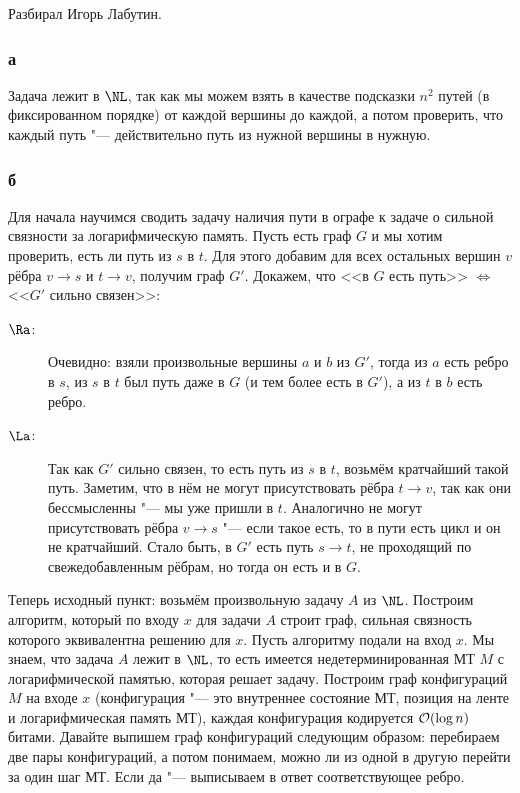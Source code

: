 	Разбирал Игорь Лабутин.

	\subsubsection{а}
		Задача лежит в $\NL$, так как мы можем взять в качестве подсказки
		$n^2$ путей (в фиксированном порядке) от каждой вершины до каждой,
		а потом проверить, что каждый путь "--- действительно путь из нужной вершины
		в нужную.

	\subsubsection{б}
		Для начала научимся сводить задачу наличия пути в ографе к
		задаче о сильной связности за логарифмическую память.
		Пусть есть граф $G$ и мы хотим проверить, есть ли путь из $s$ в $t$.
		Для этого добавим для всех остальных вершин $v$ рёбра $v \to s$ и $t \to v$,
		получим граф $G'$.
		Докажем, что <<в $G$ есть путь>> $\iff$ <<$G'$ сильно связен>>:
		\begin{description}
			\item[$\Ra$:]
				Очевидно: взяли произвольные вершины $a$ и $b$ из $G'$,
				тогда из $a$ есть ребро в $s$, из $s$ в $t$ был путь даже в
				$G$ (и тем более есть в $G'$), а из $t$ в $b$ есть ребро.
			\item[$\La$:]
				Так как $G'$ сильно связен, то есть путь из $s$ в $t$,
				возьмём кратчайший такой путь.
				Заметим, что в нём не могут присутствовать рёбра $t \to v$,
				так как они бессмысленны "--- мы уже пришли в $t$.
				Аналогично не могут присутствовать рёбра $v \to s$ "---
				если такое есть, то в пути есть цикл и он не кратчайший.
				Стало быть, в $G'$ есть путь $s \to t$, не проходящий по свежедобавленным рёбрам,
				но тогда он есть и в $G$.
		\end{description}

		Теперь исходный пункт: возьмём произвольную задачу $A$ из $\NL$.
		Построим алгоритм, который по входу $x$ для задачи $A$ строит
		граф, сильная связность которого эквивалентна решению для $x$.
		Пусть алгоритму подали на вход $x$.
		Мы знаем, что задача $A$ лежит в $\NL$, то есть имеется недетерминированная
		МТ $M$ с логарифмической памятью, которая решает задачу.
		Построим граф конфигураций $M$ на входе $x$ (конфигурация "--- это внутреннее
		состояние МТ, позиция на ленте и логарифмическая память МТ), каждая
		конфигурация кодируется $\mathcal O(\log n)$ битами.
		Давайте выпишем граф конфигураций следующим образом: перебираем две пары конфигураций,
		а потом понимаем, можно ли из одной в другую перейти за один шаг МТ.
		Если да "--- выписываем в ответ соответствующее ребро.

